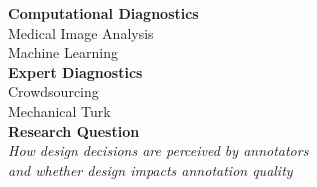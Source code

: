 \documentclass[../presentation.tex]{subfiles}
\begin{document}
\twocolumn
\null
\vfill

\large{\textbf{Computational Diagnostics}} \\
\large{Medical Image Analysis} \\
\large{Machine Learning} \\

\large{\textbf{Expert Diagnostics}} \\
\large{Crowdsourcing} \\
\large{Mechanical Turk} \\

\large{\textbf{Research Question}} \\
\large{\textit{How design decisions are perceived by annotators \\
and whether design impacts annotation quality}}

\vfill
\pagebreak
\null
\vfill


\vfill
\onecolumn
\end{document}
